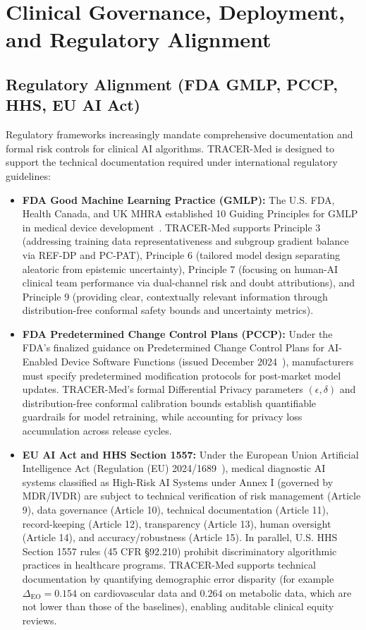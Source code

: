 \documentclass[3p,12pt]{elsarticle}
\theoremstyle{plain}
\theoremstyle{definition}
\begin{document}
\section{Clinical Governance, Deployment, and Regulatory Alignment}
\label{sec:governance}

\subsection{Regulatory Alignment (FDA GMLP, PCCP, HHS, EU AI Act)}
Regulatory frameworks increasingly mandate comprehensive documentation and formal risk controls for clinical AI algorithms. TRACER-Med is designed to support the technical documentation required under international regulatory guidelines:
\begin{itemize}
    \item \textbf{FDA Good Machine Learning Practice (GMLP):} The U.S. FDA, Health Canada, and UK MHRA established 10 Guiding Principles for GMLP in medical device development~\cite{fda2021gmlp}. TRACER-Med supports Principle 3 (addressing training data representativeness and subgroup gradient balance via REF-DP and PC-PAT), Principle 6 (tailored model design separating aleatoric from epistemic uncertainty), Principle 7 (focusing on human-AI clinical team performance via dual-channel risk and doubt attributions), and Principle 9 (providing clear, contextually relevant information through distribution-free conformal safety bounds and uncertainty metrics).
    \item \textbf{FDA Predetermined Change Control Plans (PCCP):} Under the FDA's finalized guidance on Predetermined Change Control Plans for AI-Enabled Device Software Functions (issued December 2024~\cite{fda2024pccp}), manufacturers must specify predetermined modification protocols for post-market model updates. TRACER-Med's formal Differential Privacy parameters $(\epsilon, \delta)$ and distribution-free conformal calibration bounds establish quantifiable guardrails for model retraining, while accounting for privacy loss accumulation across release cycles.
    \item \textbf{EU AI Act and HHS Section 1557:} Under the European Union Artificial Intelligence Act (Regulation (EU) 2024/1689~\cite{euaiact2024}), medical diagnostic AI systems classified as High-Risk AI Systems under Annex I (governed by MDR/IVDR) are subject to technical verification of risk management (Article 9), data governance (Article 10), technical documentation (Article 11), record-keeping (Article 12), transparency (Article 13), human oversight (Article 14), and accuracy/robustness (Article 15). In parallel, U.S. HHS Section 1557 rules (45 CFR §92.210) prohibit discriminatory algorithmic practices in healthcare programs. TRACER-Med supports technical documentation by quantifying demographic error disparity (for example $\Delta_{\text{EO}} = 0.154$ on cardiovascular data and $0.264$ on metabolic data, which are not lower than those of the baselines), enabling auditable clinical equity reviews.
\end{itemize}
\end{document}
